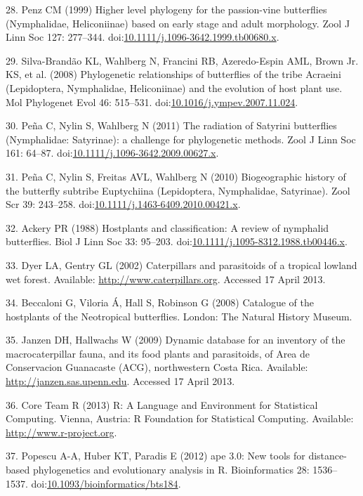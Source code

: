 \documentclass[10pt]{article}
\begin{document}
28. Penz CM (1999) Higher level phylogeny for the passion-vine
butterflies (Nymphalidae, Heliconiinae) based on early stage and adult
morphology. Zool J Linn Soc 127: 277--344.
doi:\href{http://dx.doi.org/10.1111/j.1096-3642.1999.tb00680.x}{10.1111/j.1096-3642.1999.tb00680.x}.

29. Silva-Brandão KL, Wahlberg N, Francini RB, Azeredo-Espin AML, Brown
Jr. KS, et al. (2008) Phylogenetic relationships of butterflies of the
tribe Acraeini (Lepidoptera, Nymphalidae, Heliconiinae) and the
evolution of host plant use. Mol Phylogenet Evol 46: 515--531.
doi:\href{http://dx.doi.org/10.1016/j.ympev.2007.11.024}{10.1016/j.ympev.2007.11.024}.

30. Peña C, Nylin S, Wahlberg N (2011) The radiation of Satyrini
butterflies (Nymphalidae: Satyrinae): a challenge for phylogenetic
methods. Zool J Linn Soc 161: 64--87.
doi:\href{http://dx.doi.org/10.1111/j.1096-3642.2009.00627.x}{10.1111/j.1096-3642.2009.00627.x}.

31. Peña C, Nylin S, Freitas AVL, Wahlberg N (2010) Biogeographic
history of the butterfly subtribe Euptychiina (Lepidoptera, Nymphalidae,
Satyrinae). Zool Scr 39: 243--258.
doi:\href{http://dx.doi.org/10.1111/j.1463-6409.2010.00421.x}{10.1111/j.1463-6409.2010.00421.x}.

32. Ackery PR (1988) Hostplants and classification: A review of
nymphalid butterflies. Biol J Linn Soc 33: 95--203.
doi:\href{http://dx.doi.org/10.1111/j.1095-8312.1988.tb00446.x}{10.1111/j.1095-8312.1988.tb00446.x}.

33. Dyer LA, Gentry GL (2002) Caterpillars and parasitoids of a tropical
lowland wet forest. Available: \url{http://www.caterpillars.org}.
Accessed 17 April 2013.

34. Beccaloni G, Viloria Á, Hall S, Robinson G (2008) Catalogue of the
hostplants of the Neotropical butterflies. London: The Natural History
Museum.

35. Janzen DH, Hallwachs W (2009) Dynamic database for an inventory of
the macrocaterpillar fauna, and its food plants and parasitoids, of Area
de Conservacion Guanacaste (ACG), northwestern Costa Rica. Available:
\url{http://janzen.sas.upenn.edu}. Accessed 17 April 2013.

36. Core Team R (2013) R: A Language and Environment for Statistical
Computing. Vienna, Austria: R Foundation for Statistical Computing.
Available: \url{http://www.r-project.org}.

37. Popescu A-A, Huber KT, Paradis E (2012) ape 3.0: New tools for
distance-based phylogenetics and evolutionary analysis in R.
Bioinformatics 28: 1536--1537.
doi:\href{http://dx.doi.org/10.1093/bioinformatics/bts184}{10.1093/bioinformatics/bts184}.
\end{document}
